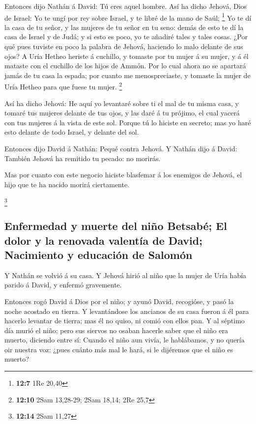  Entonces dijo Nathán á David: Tú eres aquel hombre. Así
ha dicho Jehová, Dios de Israel: Yo te ungí por rey sobre Israel, y te
libré de la mano de Saúl; \footnote{\textbf{12:7} 1Re 20,40}
 Yo te dí la casa de tu señor, y las mujeres de tu señor
en tu seno: demás de esto te dí la casa de Israel y de Judá; y si esto
es poco, yo te añadiré tales y tales cosas.  ¿Por qué pues
tuviste en poco la palabra de Jehová, haciendo lo malo delante de sus
ojos? A Uría Hetheo heriste á cuchillo, y tomaste por tu mujer á su
mujer, y á él mataste con el cuchillo de los hijos de Ammón.
 Por lo cual ahora no se apartará jamás de tu casa la
espada; por cuanto me menospreciaste, y tomaste la mujer de Uría Hetheo
para que fuese tu mujer. \footnote{\textbf{12:10} 2Sam 13,28-29; 2Sam
  18,14; 2Re 25,7}

 Así ha dicho Jehová: He aquí yo levantaré sobre ti el
mal de tu misma casa, y tomaré tus mujeres delante de tus ojos, y las
daré á tu prójimo, el cual yacerá con tus mujeres á la vista de este
sol.  Porque tú lo hiciste en secreto; mas yo haré esto
delante de todo Israel, y delante del sol.

 Entonces dijo David á Nathán: Pequé contra Jehová. Y
Nathán dijo á David: También Jehová ha remitido tu pecado: no morirás.

 Mas por cuanto con este negocio hiciste blasfemar á los
enemigos de Jehová, el hijo que te ha nacido morirá ciertamente.

\footnote{\textbf{12:14} 2Sam 11,27}

\hypertarget{enfermedad-y-muerte-del-niuxf1o-betsabuxe9-el-dolor-y-la-renovada-valentuxeda-de-david-nacimiento-y-educaciuxf3n-de-salomuxf3n}{%
\subsection{Enfermedad y muerte del niño Betsabé; El dolor y la renovada
valentía de David; Nacimiento y educación de
Salomón}\label{enfermedad-y-muerte-del-niuxf1o-betsabuxe9-el-dolor-y-la-renovada-valentuxeda-de-david-nacimiento-y-educaciuxf3n-de-salomuxf3n}}

 Y Nathán se volvió á su casa. Y Jehová hirió al niño que
la mujer de Uría había parido á David, y enfermó gravemente.

 Entonces rogó David á Dios por el niño; y ayunó David,
recogióse, y pasó la noche acostado en tierra.  Y
levantándose los ancianos de su casa fueron á él para hacerlo levantar
de tierra; mas él no quiso, ni comió con ellos pan.  Y al
séptimo día murió el niño; pero sus siervos no osaban hacerle saber que
el niño era muerto, diciendo entre sí: Cuando el niño aun vivía, le
hablábamos, y no quería oir nuestra voz: ¿pues cuánto más mal le hará,
si le dijéremos que el niño es muerto?

